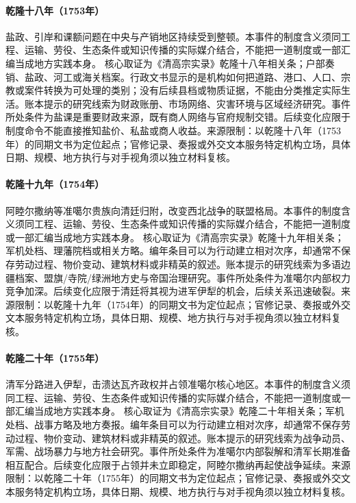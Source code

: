 \hypertarget{civic:EQ-1753-SALT-ADMINISTRATION}{}\paragraph{乾隆十八年（1753年）}盐政、引岸和课额问题在中央与产销地区持续受到整顿。本事件的制度含义须同工程、运输、劳役、生态条件或知识传播的实际媒介结合，不能把一道制度或一部汇编当成地方实践本身。 核心取证为《清高宗实录》乾隆十八年相关条；户部奏销、盐政、河工或海关档案。行政文书显示的是机构如何把道路、港口、人口、宗教或案件转换为可处理的类别；没有后续县档或物质证据，不能由分类推定实际生活。账本提示的研究线索为财政账册、市场网络、灾害环境与区域经济研究。事件所处条件为盐课是重要财政来源，既有商人网络与官府规制交错。后续变化应限于制度命令不能直接推知盐价、私盐或商人收益。来源限制：以乾隆十八年（1753年）的同期文书为定位起点；官修记录、奏报或外交文本服务特定机构立场，具体日期、规模、地方执行与对手视角须以独立材料复核。
\hypertarget{civic:EQ-1754-AMURSANA-DEFECTION}{}\paragraph{乾隆十九年（1754年）}阿睦尔撒纳等准噶尔贵族向清廷归附，改变西北战争的联盟格局。本事件的制度含义须同工程、运输、劳役、生态条件或知识传播的实际媒介结合，不能把一道制度或一部汇编当成地方实践本身。 核心取证为《清高宗实录》乾隆十九年相关条；军机处档、理藩院档或相关方略。编年条目可以为行动建立相对次序，却通常不保存劳动过程、物价变动、建筑材料或非精英的叙述。账本提示的研究线索为多语边疆档案、盟旗/寺院/绿洲地方史与帝国治理研究。事件所处条件为准噶尔内部权力竞争加深。后续变化应限于清廷将其视为进军伊犁的机会，后续关系迅速破裂。来源限制：以乾隆十九年（1754年）的同期文书为定位起点；官修记录、奏报或外交文本服务特定机构立场，具体日期、规模、地方执行与对手视角须以独立材料复核。
\hypertarget{civic:EQ-1755-ILI-EXPEDITION}{}\paragraph{乾隆二十年（1755年）}清军分路进入伊犁，击溃达瓦齐政权并占领准噶尔核心地区。本事件的制度含义须同工程、运输、劳役、生态条件或知识传播的实际媒介结合，不能把一道制度或一部汇编当成地方实践本身。 核心取证为《清高宗实录》乾隆二十年相关条；军机处档、战事方略及地方奏报。编年条目可以为行动建立相对次序，却通常不保存劳动过程、物价变动、建筑材料或非精英的叙述。账本提示的研究线索为战争动员、军需、战场暴力与地方社会研究。事件所处条件为准噶尔内部裂解和清军长期准备相互配合。后续变化应限于占领并未立即稳定，阿睦尔撒纳再起使战争延续。来源限制：以乾隆二十年（1755年）的同期文书为定位起点；官修记录、奏报或外交文本服务特定机构立场，具体日期、规模、地方执行与对手视角须以独立材料复核。

